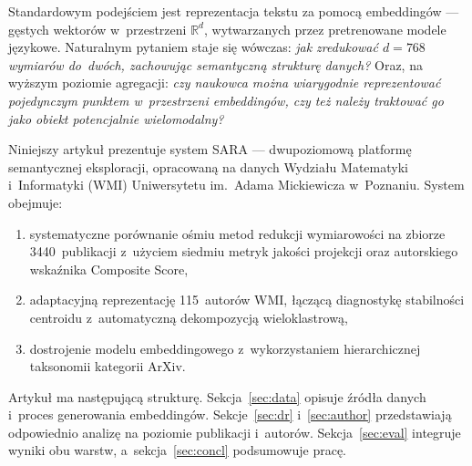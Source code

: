 \documentclass[a4paper,11pt,twocolumn]{article}
\begin{document}

Standardowym podejściem jest reprezentacja tekstu za pomocą embeddingów
--- gęstych wektorów w~przestrzeni $\mathbb{R}^d$, wytwarzanych przez
pretrenowane modele językowe. Naturalnym pytaniem staje się wówczas:
\emph{jak zredukować $d=768$ wymiarów do~dwóch, zachowując semantyczną
strukturę danych?} Oraz, na wyższym poziomie agregacji: \emph{czy
naukowca można wiarygodnie reprezentować pojedynczym punktem
w~przestrzeni embeddingów, czy też należy traktować go jako obiekt
potencjalnie wielomodalny?}

Niniejszy artykuł prezentuje system SARA --- dwupoziomową platformę
semantycznej eksploracji, opracowaną na danych Wydziału Matematyki
i~Informatyki (WMI) Uniwersytetu im.~Adama Mickiewicza w~Poznaniu.
System obejmuje:
\begin{enumerate}
  \item systematyczne porównanie ośmiu metod redukcji wymiarowości
        na zbiorze 3440~publikacji z~użyciem siedmiu metryk jakości
        projekcji oraz autorskiego wskaźnika Composite Score,
  \item adaptacyjną reprezentację 115~autorów WMI, łączącą diagnostykę
        stabilności centroidu z~automatyczną dekompozycją
        wieloklastrową,
  \item dostrojenie modelu embeddingowego z~wykorzystaniem hierarchicznej
        taksonomii kategorii ArXiv.
\end{enumerate}

Artykuł ma następującą strukturę. Sekcja~\ref{sec:data} opisuje źródła
danych i~proces generowania embeddingów. Sekcje~\ref{sec:dr}
i~\ref{sec:author} przedstawiają odpowiednio analizę na poziomie
publikacji i~autorów. Sekcja~\ref{sec:eval} integruje wyniki obu
warstw, a~sekcja~\ref{sec:concl} podsumowuje pracę.
\end{document}
